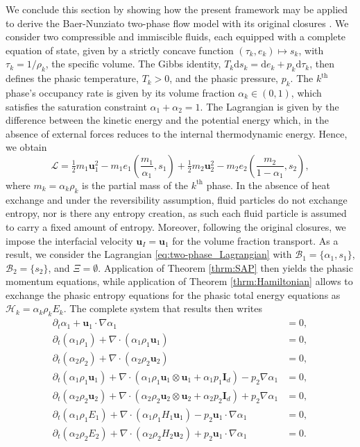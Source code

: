 \documentclass{myclass}
\newcommand{\Lag}{\mathscr{L}}
\newcommand{\Ham}{\mathcal{H}}
\newcommand{\Xiset}{\Xi}
\newcommand{\Bset}{\mathscr{B}}
\newcommand{\Id}{\mathbf{I}_d}
\newcommand{\half}{\tfrac{1}{2}}
\newcommand{\vel}{\bm{u}}
\newcommand{\pth}[1]  {\left( #1 \right)}
\begin{document}
We conclude this section by showing how the present framework may be applied to derive the Baer-Nunziato two-phase flow model with its original closures  \cite{baer:1986}. We consider two compressible and immiscible fluids, each equipped with a complete equation of state, given by a strictly concave function $(\tau_k, e_k)\mapsto s_k$, with $\tau_k=1/\rho_k$, the specific volume. The Gibbs identity, $T_k\mathrm{d}s_k=\mathrm{d}e_k + p_k\mathrm{d}\tau_k$, then defines the phasic temperature, $T_k>0$, and the phasic pressure, $p_k$. The $k^\text{th}$ phase's occupancy rate is given by its volume fraction $\alpha_k\in(0,1)$, which satisfies the saturation constraint $\alpha_1+\alpha_2=1$. The Lagrangian is given by the difference between the kinetic energy and the potential energy which, in the absence of external forces reduces to the internal thermodynamic energy. Hence, we obtain
\begin{equation}\label{eq:two-phase_Lagrangian}
\Lag = \half m_1 \vel_1^2 - m_1 e_1\pth{\dfrac{m_1}{\alpha_1},s_1} + \half m_2 \vel_2^2 - m_2 e_2\pth{\dfrac{m_2}{1-\alpha_1},s_2},
\end{equation}
where $m_k=\alpha_k\rho_k$ is the partial mass of the $k^\text{th}$ phase. In the absence of heat exchange and under the reversibility assumption, fluid particles do not exchange entropy, nor is there any entropy creation, as such each fluid particle is assumed to carry a fixed amount of entropy. Moreover, following the original closures, we impose the interfacial velocity $\vel_I=\vel_1$ for the volume fraction transport. As a result, we consider the Lagrangian \eqref {eq:two-phase_Lagrangian} with $\Bset_1 = \{\alpha_1, s_1\}$, $\Bset_2 = \{s_2\}$, and $\Xiset = \emptyset$. Application of Theorem \ref{thrm:SAP} then yields the phasic momentum equations, while application of Theorem \ref{thrm:Hamiltonian} allows to exchange the phasic entropy equations for the phasic total energy equations as $\Ham_k=\alpha_k\rho_k E_k$. The complete system that results then writes
\begin{subequations}
\begin{align}
\partial_t\alpha_1 + \vel_1\cdot\nabla\alpha_1 &=0, \label{eq:BN_vol_frac_transport}\\
\partial_t\pth{\alpha_1 \rho_1} + \nabla\cdot\pth{\alpha_1 \rho_1 \vel_1} &=0,\\
\partial_t\pth{\alpha_2 \rho_2} + \nabla\cdot\pth{\alpha_2 \rho_2 \vel_2} &=0,\\
\partial_t\pth{\alpha_1\rho_1\vel_1} + \nabla\cdot\pth{\alpha_1\rho_1\vel_1\otimes\vel_1 + \alpha_1 p_1\Id} - p_2\nabla\alpha_1 &=0,\\
\partial_t\pth{\alpha_2\rho_2\vel_2} + \nabla\cdot\pth{\alpha_2\rho_2\vel_2\otimes\vel_2 + \alpha_2 p_2\Id} + p_2\nabla\alpha_1 &=0,\\
\partial_t\pth{\alpha_1\rho_1 E_1} + \nabla\cdot\pth{\alpha_1\rho_1 H_1\vel_1} - p_2\vel_1\cdot\nabla\alpha_1 &=0,\\
\partial_t\pth{\alpha_2\rho_2 E_2} + \nabla\cdot\pth{\alpha_2\rho_2 H_2\vel_2} + p_2\vel_1\cdot\nabla\alpha_1 &=0.
\end{align}
\end{subequations}
\end{document}
